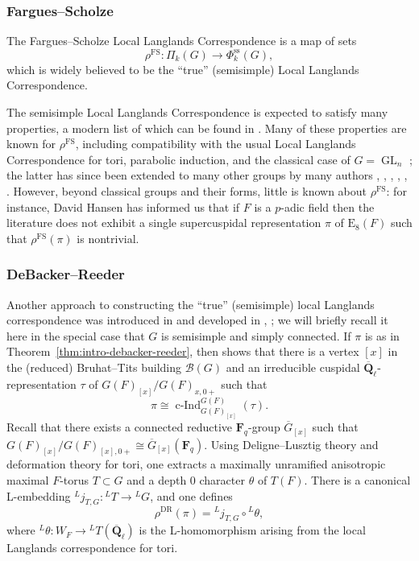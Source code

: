 \documentclass[reqno]{amsart}
\numberwithin{equation}{subsection}
\newcommand{\F}{\mathbf{F}}
\newcommand{\Q}{\mathbf{Q}}
\newcommand{\ol}[1]{\overline{#1}}
\newcommand{\co}{\colon}
\newcommand{\ld}{{}^L}
\newcommand\cB{\mathcal{B}}
\DeclareMathOperator{\GL}{GL}
\DeclareMathOperator{\FS}{FS}
\DeclareMathOperator{\cInd}{c-Ind}
\DeclareMathOperator{\DR}{DR}
\renewcommand{\ss}{\mathrm{ss}}
\theoremstyle{remark}
\numberwithin{equation}{subsection}
\numberwithin{figure}{subsection}
\begin{document}
\subsubsection{Fargues--Scholze}

The Fargues--Scholze Local Langlands Correspondence \cite[\S I.9]{FS} is a map of sets
\[
\rho^{\FS}\co \Pi_k(G) \to \Phi_k^{\ss}(G),
\]
which is widely believed to be the ``true'' (semisimple) Local Langlands Correspondence.

The semisimple Local Langlands Correspondence is expected to satisfy many properties, a modern list of which can be found in \cite[\S 6]{Tai25}. Many of these properties are known for $\rho^{\FS}$, including compatibility with the usual Local Langlands Correspondence for tori, parabolic induction, and the classical case of $G = \GL_n$ \cite[Theorem~I.9.6]{FS}; the latter has since been extended to many other groups by many authors \cite{HKW22}, \cite{BMHN24}, \cite{Ham25}, \cite{Pen26}, \cite{Han26}, \cite{DvHKZ26}. However, beyond classical groups and their forms, little is known about $\rho^{\FS}$: for instance, David Hansen has informed us that if $F$ is a $p$-adic field then the literature does not exhibit a single supercuspidal representation $\pi$ of $\mathrm{E}_8(F)$ such that $\rho^{\FS}(\pi)$ is nontrivial.

\subsubsection{DeBacker--Reeder}\label{sss:intro-dr}

Another approach to constructing the ``true'' (semisimple) local Langlands correspondence was introduced in \cite{DR09} and developed in \cite{Kal19}, \cite{Kal21b}; we will briefly recall it here in the special case that $G$ is semisimple and simply connected. If $\pi$ is as in Theorem~\ref{thm:intro-debacker-reeder}, then \cite[Proposition 6.8]{MP96} shows that there is a vertex $[x]$ in the (reduced) Bruhat--Tits building $\cB(G)$ and an irreducible cuspidal $\ol\Q_\ell$-representation $\tau$ of $G(F)_{[x]}/G(F)_{x,0+}$ such that 
\begin{equation}\label{eqn:intro-depth-0-rep}
    \pi \cong \cInd_{G(F)_{[x]}}^{G(F)}(\tau).
\end{equation}
Recall that there exists a connected reductive $\F_q$-group $\ol G_{[x]}$ such that $G(F)_{[x]}/G(F)_{[x],0+} \cong \ol G_{[x]}(\F_q)$. Using Deligne--Lusztig theory \cite{DL76} and deformation theory for tori, one extracts a maximally unramified anisotropic maximal $F$-torus $T \subset G$ and a depth $0$ character $\theta$ of $T(F)$. There is a canonical L-embedding $\ld j_{T,G}\co \ld T \to \ld G$, and one defines
\[
\rho^{\DR}(\pi) = \ld j_{T,G} \circ \ld\theta,
\]
where $\ld\theta\co W_F \to \ld T(\ol\Q_\ell)$ is the L-homomorphism arising from the local Langlands correspondence for tori.
\end{document}
